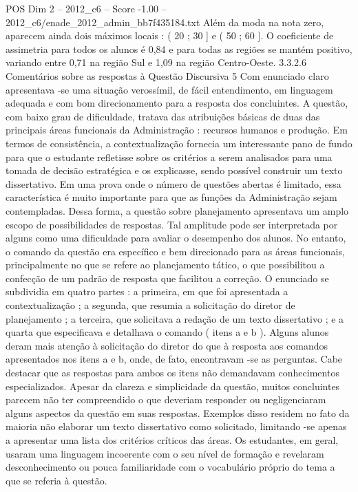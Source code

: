 \begin{textsample}{POS Dim 2 – 2012\_c6 – Score -1.00 – 2012\_c6/enade\_2012\_admin\_bb7f435184.txt}
Além da moda na nota zero, aparecem ainda dois máximos locais : ( 20 ; 30 ] e ( 50 ; 60 ].
O coeficiente de assimetria para todos os alunos é 0,84 e para todas as regiões se mantém positivo, variando entre 0,71 na região Sul e 1,09 na região Centro-Oeste. 3.3.2.6 Comentários sobre as respostas à Questão Discursiva 5 Com enunciado claro apresentava -se uma situação verossímil, de fácil entendimento, em linguagem adequada e com bom direcionamento para a resposta dos concluintes.
A questão, com baixo grau de dificuldade, tratava das atribuições básicas de duas das principais áreas funcionais da Administração : recursos humanos e produção.
Em termos de consistência, a contextualização fornecia um interessante pano de fundo para que o estudante refletisse sobre os critérios a serem analisados para uma tomada de decisão estratégica e os explicasse, sendo possível construir um texto dissertativo.
Em uma prova onde o número de questões abertas é limitado, essa característica é muito importante para que as funções da Administração sejam contempladas.
Dessa forma, a questão sobre planejamento apresentava um amplo escopo de possibilidades de respostas.
Tal amplitude pode ser interpretada por alguns como uma dificuldade para avaliar o desempenho dos alunos.
No entanto, o comando da questão era específico e bem direcionado para as áreas funcionais, principalmente no que se refere ao planejamento tático, o que possibilitou a confecção de um padrão de resposta que facilitou a correção.
O enunciado se subdividia em quatro partes : a primeira, em que foi apresentada a contextualização ; a segunda, que resumia a solicitação do diretor de planejamento ; a terceira, que solicitava a redação de um texto dissertativo ; e a quarta que especificava e detalhava o comando ( itens a e b ).
Alguns alunos deram mais atenção à solicitação do diretor do que à resposta aos comandos apresentados nos itens a e b, onde, de fato, encontravam -se as perguntas.
Cabe destacar que as respostas para ambos os itens não demandavam conhecimentos especializados.
Apesar da clareza e simplicidade da questão, muitos concluintes parecem não ter compreendido o que deveriam responder ou negligenciaram alguns aspectos da questão em suas respostas.
Exemplos disso residem no fato da maioria não elaborar um texto dissertativo como solicitado, limitando -se apenas a apresentar uma lista dos critérios críticos das áreas.
Os estudantes, em geral, usaram uma linguagem incoerente com o seu nível de formação e revelaram desconhecimento ou pouca familiaridade com o vocabulário próprio do tema a que se referia à questão.

\end{textsample}
